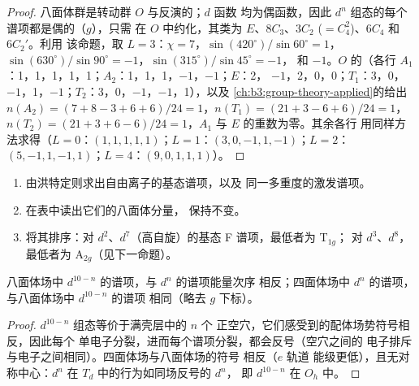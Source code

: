\begin{proof}
八面体群是转动群 $O$ 与反演的；$d$ 函数
均为偶函数，因此 $d^n$ 组态的每个谱项都是偶的（$g$），只需
在 $O$ 中约化，其类为 $E$、$8C_3$、$3C_2$ ($=C_4^2$)、$6C_4$ 和 $6C_2'$。利用
该命题，取 $L = 3$：$\chi = 7$，$\sin(420^\circ)/\sin60^\circ = 1$，$\sin(630^\circ)/\sin90^\circ = -1$，$\sin(315^\circ)/\sin45^\circ = -1$，
和 $-1$。$O$ 的（各行 $A_1$：1，1，1，1，1；$A_2$：1，1，1，$-1$，$-1$；$E$：2，
$-1$，2，0，0；$T_1$：3，0，$-1$，1，$-1$；$T_2$：3，0，$-1$，$-1$，1），以及
\cref{ch:b3:group-theory-applied}的给出 $n(A_2) = (7 + 8 - 3 + 6 + 6)/24 = 1$，$n(T_1) = (21 + 3 - 6 +
6)/24 = 1$，$n(T_2) = (21 + 3 + 6 - 6)/24 = 1$，$A_1$ 与 $E$ 的重数为零。其余各行
用同样方法求得（$L = 0$：$(1, 1, 1, 1, 1)$；$L = 1$：$(3, 0, -1, 1, -1)$；$L = 2$：$(5, -1, 1,
-1, 1)$；$L = 4$：$(9, 0, 1, 1, 1)$）。
\end{proof}

\begin{method}[自由离子谱项的分裂]\label{met:b3:complex-spectra-magnetism:split-term}
\begin{enumerate}
  \item 由洪特定则求出自由离子的基态谱项，以及
        同一多重度的激发谱项。
  \item 在表中读出它们的八面体分量，
        保持不变。
  \item 将其排序：对 $d^2$、$d^7$（高自旋）的基态 F 谱项，最低者为 T$_{1g}$；
        对 $d^3$、$d^8$，最低者为 A$_{2g}$（见下一命题）。
\end{enumerate}
\end{method}

\begin{proposition}[空穴与四面体反转]\label{prop:b3:complex-spectra-magnetism:hole}
八面体场中 $d^{10-n}$ 的谱项，与 $d^n$ 的谱项能量次序
相反；四面体场中 $d^n$ 的谱项，与八面体场中 $d^{10-n}$ 的谱项
相同（略去 $g$ 下标）。
\end{proposition}

\begin{proof}
$d^{10-n}$ 组态等价于满壳层中的 $n$ 个
正空穴，它们感受到的配体场势符号相反，因此每个
单电子分裂，进而每个谱项分裂，都会反号（空穴之间的
电子排斥与电子之间相同）。四面体场与八面体场的符号
相反（$e$ 轨道
能级更低），且无对称中心：$d^n$ 在 $T_d$ 中的行为如同场反号的 $d^n$，
即 $d^{10-n}$ 在 $O_h$ 中。
\end{proof}

